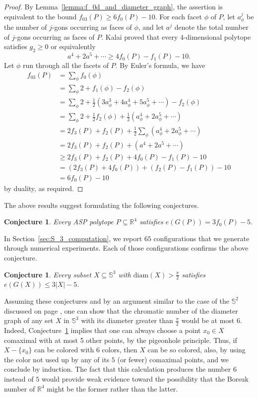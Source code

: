 \documentclass[12pt]{amsart}
\theoremstyle{plain}
\newtheorem{conjecture}[theorem]{Conjecture}
\newcommand{\R}{\mathbb{R}}
\newcommand{\Sp}{\mathbb{S}}
\newcommand{\diam}{\mathrm{diam}}
\numberwithin{equation}{section}
\begin{document}
\begin{proof}
By Lemma~\ref{lemma:f_0d_and_diameter_graph}, the assertion is equivalent to the bound
$f_{03}(P)\geq 6f_0(P) - 10$.  For each facet $\phi$ of $P$, let $a_\phi^j$ be
the number of $j$-gons occurring as faces of $\phi$, and let $a^j$
denote the total number of $j$-gons occurring as faces of $P$.  Kalai
\cite[Section~4.3]{Ka94} proved that every $4$-dimensional polytope satisfies
$g_2\geq0$ or equivalently
\[
a^4+2a^5+\cdots\geq4f_0(P)-f_1(P)-10.
\]
Let $\phi$ run through all the facets of $P$.  By Euler's formula, we
have
\[
\begin{aligned}
f_{03}(P) & =\sum_\phi f_0(\phi)
\\&=
\sum_\phi 2+f_1(\phi)-f_2(\phi)
\\&=
\sum_\phi 2 + \frac12(3a_\phi^3+4a_\phi^4+5a_\phi^5+\cdots) - f_2(\phi)
\\&=
\sum_\phi 2 + \frac12 f_2(\phi) + \frac12(a_\phi^4+2a_\phi^5+\cdots)
\\&=
2f_3(P)+ f_2(P) +\frac12 \sum_\phi(a_\phi^4+2a_\phi^5+\cdots)
\\&=
2f_3(P)+ f_2(P) + (a^4+2a^5+\cdots)
\\&\geq
2f_3(P)+f_2(P)+ 4f_0(P)-f_1(P) -10
\\&=
(2f_3(P)+4f_0(P))+ (f_2(P)-f_1(P)) -10
\\&=
6f_0(P)-10
\end{aligned}
\]
by duality, as required.
\end{proof}

The above results suggest formulating the following conjectures.


\begin{conjecture}\label{conj:num_edges_S_3}
Every ASP polytope $P\subseteq\R^4$ satisfies $e(G(P))= 3 f_0(P) -5$.
\end{conjecture}

In Section~\ref{sec:S_3_computation}, we report $65$ configurations
that we generate through numerical experiments. Each of those
configurations confirms the above conjecture.


\begin{conjecture}\label{conj:3x-5}
Every subset $X\subseteq\Sp^3$ with $\diam(X)>\frac{\pi}{2}$ satisfies
$e(G(X))\leq3|X|-5$.
\end{conjecture}



Assuming these conjectures and by an argument similar to the case of
the $\Sp^2$ discussed on page \pageref{heppes}, one can show that the
chromatic number of the diameter graph of any set $X$ in $\Sp^3$ with
its diameter greater than $\frac{\pi}{2}$ would be at most 6.  Indeed,
Conjecture~\ref{conj:3x-5} implies that one can always choose a point
$x_0\in X$ comaximal with at most 5 other points, by the pigeonhole
principle. Thus, if $X-\{x_0\}$ can be colored with $6$ colors, then
$X$ can be so colored, also, by using the color not used up by any of
its $5$ (or fewer) comaximal points, and we conclude by induction.
The fact that this calculation produces the number $6$ instead of $5$
would provide weak evidence toward the possibility that the Borsuk
number of $\R^4$ might be the former rather than the latter.
\end{document}
